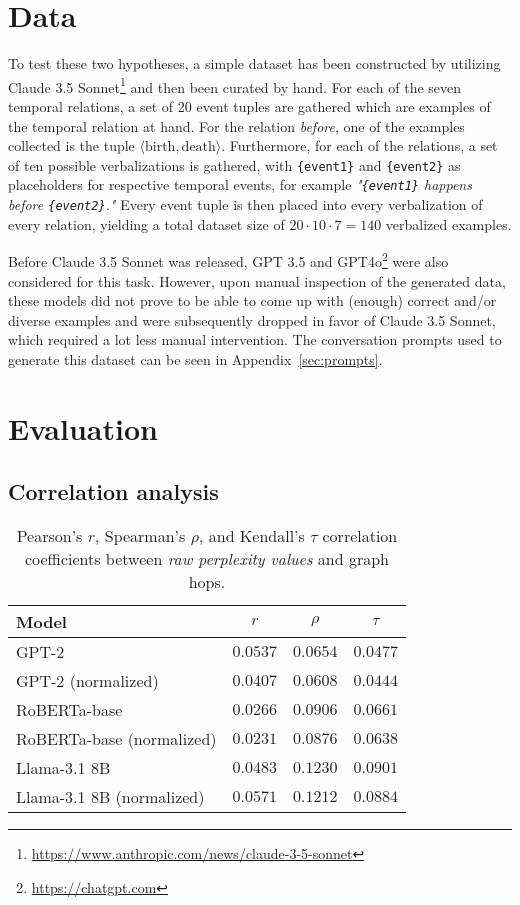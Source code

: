 \documentclass[11pt]{article}
\begin{document}
\section{Data}
To test these two hypotheses, a simple dataset has been constructed by utilizing Claude 3.5 Sonnet\footnote{\url{https://www.anthropic.com/news/claude-3-5-sonnet}} and then been curated by hand. For each of the seven temporal relations, a set of 20 event tuples are gathered which are examples of the temporal relation at hand. For the relation \textit{before}, one of the examples collected is the tuple $\langle \text{birth}, \text{death}\rangle$.
Furthermore, for each of the relations, a set of ten possible verbalizations is gathered, with \texttt{\{event1\}} and \texttt{\{event2\}} as placeholders for respective temporal events, for example \textit{"\texttt{\{event1\}} happens before \texttt{\{event2\}}."}
Every event tuple is then placed into every verbalization of every relation, yielding a total dataset size of $20 \cdot 10 \cdot 7 = 140$ verbalized examples.

Before Claude 3.5 Sonnet was released, GPT 3.5 and GPT4o\footnote{\url{https://chatgpt.com}} were also considered for this task. However, upon manual inspection of the generated data, these models did not prove to be able to come up with (enough) correct and/or diverse examples and were subsequently dropped in favor of Claude 3.5 Sonnet, which required a lot less manual intervention. The conversation prompts used to generate this dataset can be seen in Appendix~\ref{sec:prompts}.

\section{Evaluation} %
\label{sec:Evaluation}
\subsection{Correlation analysis}
\begin{table*}
  \centering
  \begin{tabular}{l c c c}
    \toprule
    Model & $r$ & $\rho$ & $\tau$ \\
    \midrule
    GPT-2 & $0.0537$ & $0.0654$ & $0.0477$ \\
    GPT-2 (normalized) & $0.0407$ & $0.0608$ & $0.0444$ \\
    RoBERTa-base & $0.0266$ & $0.0906$ & $0.0661$ \\
    RoBERTa-base (normalized) & $0.0231$ & $0.0876$ & $0.0638$ \\
    Llama-3.1 8B & $0.0483$ & $0.1230$ & $0.0901$ \\
    Llama-3.1 8B (normalized) & $0.0571$ & $0.1212$ & $0.0884$ \\
    \bottomrule
  \end{tabular}
  \caption{Pearson's $r$, Spearman's $\rho$, and Kendall's $\tau$ correlation coefficients between \emph{raw perplexity values} and graph hops.}
  \label{raw_correlations}
\end{table*}
\end{document}
